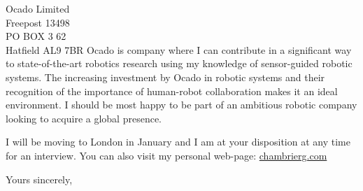 \documentclass[11pt]{letter} %
\begin{document}
\begin{letter}{Ocado Limited\\ Freepost 13498\\ PO BOX 3 62\\ Hatfield AL9 7BR}
Ocado is company where I can contribute in a significant way to state-of-the-art robotics research using my knowledge of sensor-guided robotic systems. 
The increasing investment by Ocado in robotic systems and their recognition of the importance of human-robot collaboration makes it an ideal environment. 
I should be most happy to be part of an ambitious robotic company looking to acquire a global presence.

I will be moving to London in January and I am at your disposition at any
time for an interview. You can also visit my personal web-page: \href{www.chambrierg.com}{chambrierg.com}

\closing{Yours sincerely,}




\end{letter}
\end{document}
